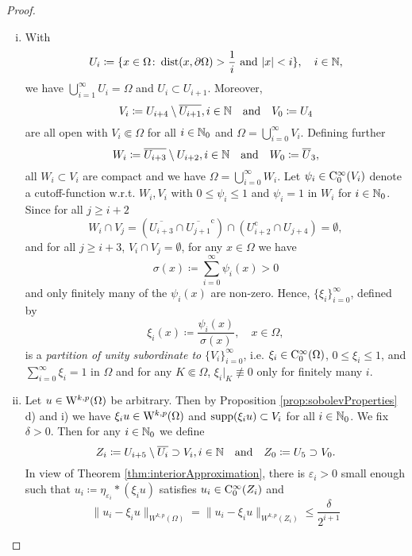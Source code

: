 \begin{proof}
  \begin{enumerate}[i)]
  \item With
    $$
    U_i \coloneqq \{ x \in \Omega \colon \operatorname{dist}(x, \partial \Omega) > \frac{1}{i} \text{ and } |x| < i\}, \quad i \in \mathbb{N},
    $$
    we have $\bigcup_{i = 1}^\infty U_i = \Omega$ and $U_i \subset U_{i + 1}$.
    Moreover, 
    $$V_i \coloneqq U_{i + 4} \setminus \overline{U_{i + 1}}, i \in \mathbb{N}\quad\text{and}\quad V_0\coloneqq U_4$$
    are all open with $V_i \Subset \Omega$ for all $i \in \mathbb{N}_0$ and  $\Omega = \bigcup_{i = 0}^\infty V_i$.
    Defining further 
    $$
    W_i \coloneqq \overline{U_{i + 3}} \setminus U_{i + 2}, i \in \mathbb{N} \quad\text{and}\quad W_0 \coloneqq \overline U_3,
    $$
    all $W_i \subset V_i$ are compact and we have $\Omega = \bigcup_{i = 0}^\infty W_i$.
    Let $\psi_i \in \mathrm{C}_0^\infty(V_i)$ denote a cutoff-function w.r.t. $W_i, V_i$ with $0 \leq \psi_i \leq 1$ and $\psi_i = 1$ in $W_i$ for $i \in \mathbb{N}_0$.
    Since for all $j \geq i + 2$
    $$W_i \cap V_j 
    = \left(\overline{U_{i + 3}} \cap \overline{U_{j + 1}}^{\mathrm c}  \right)\cap \left( U_{i + 2}^{\mathrm c} \cap  U_{j + 4}   \right) 
    =  \emptyset,$$ 
    and for all $j \geq i + 3$, $V_i \cap V_j = \emptyset$, for any $x \in \Omega$ we have
    $$
    \sigma(x) \coloneqq \sum_{i = 0}^\infty \psi_i(x) > 0
    $$
    and only finitely many of the $\psi_i(x)$ are non-zero.
    Hence, $\{\xi_i\}_{i = 0}^\infty$, defined by
    $$\xi_i(x) \coloneqq \frac{\psi_i(x)}{\sigma(x)}, \quad x \in \Omega,$$
      is a \emph{partition of unity subordinate to} $\{V_i\}_{i = 0}^\infty$, i.e. $\xi_i \in \mathrm{C}_0^\infty(\Omega)$, $0 \leq \xi_i \leq 1$, and $\sum_{i = 0}^\infty \xi_i = 1$ in $\Omega$ and for any $K \Subset \Omega$, $\xi_i|_K \not\equiv 0$ only for finitely many $i$.
  \item Let $u \in \mathrm{W}^{k,p}(\Omega)$ be arbitrary.
    Then by Proposition \ref{prop:sobolevProperties} d) and i) we have $\xi_i u \in \mathrm{W}^{k,p}(\Omega)$ and $\operatorname{supp}(\xi_i u) \subset V_i$ for all $i \in \mathbb{N}_0$.
    We fix $\delta > 0$.
    Then for any $i \in \mathbb{N}_0$ we define
    $$
    Z_i \coloneqq U_{i + 5} \setminus \overline{U_i} \supset V_i, i \in \mathbb{N} \quad\text{and}\quad Z_0 \coloneqq U_5 \supset V_0.
    $$
    In view of Theorem \ref{thm:interiorApproximation}, there is $\varepsilon_i > 0$ small enough such that $u_i \coloneqq \eta_{\varepsilon_i} \ast (\xi_i u)$ satisfies $u_i \in \mathrm{C}_0^\infty(Z_i)$ and
    \begin{equation}
      \|u_i - \xi_i u \|_{W^{k,p}(\Omega)} = \|u_i - \xi_i u\|_{W^{k,p}(Z_i)} \leq \frac{\delta}{2^{i + 1}}

\end{equation}
\end{enumerate}
\end{proof}
